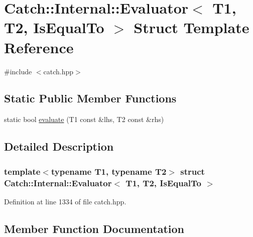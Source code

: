 \hypertarget{struct_catch_1_1_internal_1_1_evaluator_3_01_t1_00_01_t2_00_01_is_equal_to_01_4}{}\section{Catch\+:\+:Internal\+:\+:Evaluator$<$ T1, T2, Is\+Equal\+To $>$ Struct Template Reference}
\label{struct_catch_1_1_internal_1_1_evaluator_3_01_t1_00_01_t2_00_01_is_equal_to_01_4}


{\ttfamily \#include $<$catch.\+hpp$>$}

\subsection*{Static Public Member Functions}
\begin{DoxyCompactItemize}
\item 
static bool \hyperlink{struct_catch_1_1_internal_1_1_evaluator_3_01_t1_00_01_t2_00_01_is_equal_to_01_4_a166b2b7849247397e63fb2940481b217}{evaluate} (T1 const \&lhs, T2 const \&rhs)
\end{DoxyCompactItemize}


\subsection{Detailed Description}
\subsubsection*{template$<$typename T1, typename T2$>$\newline
struct Catch\+::\+Internal\+::\+Evaluator$<$ T1, T2, Is\+Equal\+To $>$}



Definition at line 1334 of file catch.\+hpp.



\subsection{Member Function Documentation}
\hypertarget{struct_catch_1_1_internal_1_1_evaluator_3_01_t1_00_01_t2_00_01_is_equal_to_01_4_a166b2b7849247397e63fb2940481b217}{}\label{struct_catch_1_1_internal_1_1_evaluator_3_01_t1_00_01_t2_00_01_is_equal_to_01_4_a166b2b7849247397e63fb2940481b217} 
